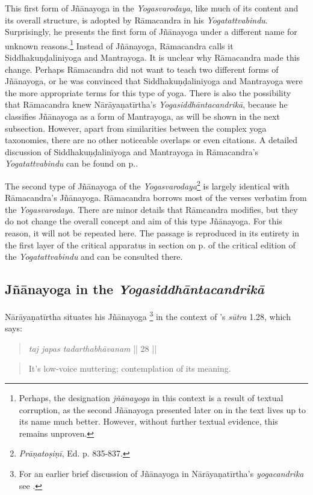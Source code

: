 This first form of Jñānayoga in the \textit{Yogasvarodaya}, like much of its content and its overall structure, is adopted by Rāmacandra in his \textit{Yogatattvabindu}. Surprisingly, he presents the first form of Jñānayoga under a different name for unknown reasons.\footnote{Perhaps, the designation \textit{jñānayoga} in this context is a result of textual corruption, as the second Jñānayoga presented later on in the text lives up to its name much better. However, without further textual evidence, this remains unproven.} Instead of Jñānayoga, Rāmacandra calls it Siddhakuṇḍaliniyoga and Mantrayoga. It is unclear why Rāmacandra made this change. Perhaps Rāmacandra did not want to teach two different forms of Jñānayoga, or he was convinced that Siddhakuṇḍaliniyoga and Mantrayoga were the more appropriate terms for this type of yoga. There is also the possibility that Rāmacandra knew Nārāyaṇatīrtha's \emph{Yogasiddhāntacandrikā}, because he classifies Jñānayoga as a form of Mantrayoga, as will be shown in the next subsection. However, apart from similarities between the complex yoga taxonomies, there are no other noticeable overlaps or even citations. A detailed discussion of Siddhakuṇḍalinīyoga and Mantrayoga in Rāmacandra's \textit{Yogatattvabindu} can be found on p.\pageref{siddhayogaintro}.

The second type of Jñānayoga of the \emph{Yogasvarodaya}\footnote{\textit{Prāṇatoṣiṇī}, Ed. p. 835-837.} is largely identical with Rāmacandra's Jñānayoga. Rāmacandra borrows most of the verses verbatim from the \textit{Yogasvarodaya}. There are minor details that Rāmcandra modifies, but they do not change the overall concept and aim of this type Jñānayoga. For this reason, it will not be repeated here. The passage is reproduced in its entirety in the first layer of the critical apparatus in section  on p. \pageref{jnanayogastart} of the critical edition of the \textit{Yogatattvabindu} and can be consulted there.   

\subsection{Jñānayoga in the \textit{Yogasiddhāntacandrikā}}
\label{jnanayogaintrocandrika}
Nārāyaṇatīrtha situates his Jñānayoga \footnote{For an earlier brief discussion of Jñānayoga in Nārāyaṇatīrtha's \textit{yogacandrika} see \citeauthor[2004: 76]{penna2004}.} in the context of 's \textit{sūtra} 1.28, which says:
\begin{quote} \textit{taj japas tadarthabhāvanam} || 28 || \end{quote}
\begin{quote} It's low-voice muttering; contemplation of its meaning. \end{quote}


